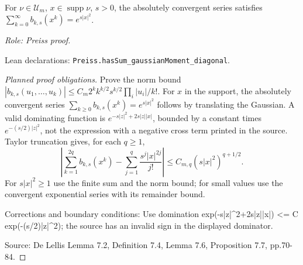 \begin{lemma}
\label{lem:gaussian-translation-series}







For $\nu\in\mathcal U_m$, $x\in\operatorname{supp}\nu$, $s>0$, the absolutely convergent series satisfies $\sum_{k=0}^{\infty}b_{k,s}(x^k)=e^{s|x|^2}$.
\par\emph{Role: Preiss proof.}
\par Lean declarations: \texttt{Preiss.hasSum\_gaussianMoment\_diagonal}.
\end{lemma}
\begin{proof}[Planned proof obligations]

Prove the norm bound
$|b_{k,s}(u_1,\ldots,u_k)|\leq
C_m 2^k k^{k/2}s^{k/2}\prod_i|u_i|/k!$.
For $x$ in the support, the absolutely convergent series
$\sum_{k\geq0} b_{k,s}(x^k)=e^{s|x|^2}$ follows by translating the
Gaussian. A valid dominating function is
$e^{-s|z|^2+2s|z||x|}$, bounded by a constant times
$e^{-(s/2)|z|^2}$, not the expression with a negative cross term printed in
the source. Taylor truncation gives, for each $q\geq1$,
\[
 \left|\sum_{k=1}^{2q}b_{k,s}(x^k)
 -\sum_{j=1}^{q}\frac{s^j|x|^{2j}}{j!}\right|
 \leq C_{m,q}(s|x|^2)^{q+1/2}.
\]
For $s|x|^2\geq1$ use the finite sum and the norm bound; for small values use
the convergent exponential series with its remainder bound.
\par Corrections and boundary conditions: Use domination exp(-s|z|\textasciicircum{}2+2s|z||x|) <= C exp(-(s/2)|z|\textasciicircum{}2); the source has an invalid sign in the displayed dominator.
\par Source: De Lellis Lemma 7.2, Definition 7.4, Lemma 7.6, Proposition 7.7, pp.70-84.
\end{proof}

